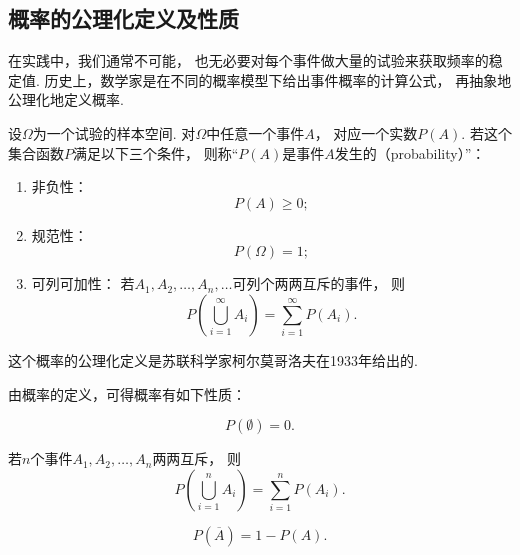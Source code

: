 \subsection{概率的公理化定义及性质}
在实践中，我们通常不可能，
也无必要对每个事件做大量的试验来获取频率的稳定值.
历史上，数学家是在不同的概率模型下给出事件概率的计算公式，
再抽象地公理化地定义概率.

\begin{definition}
设\(\Omega\)为一个试验的样本空间.
对\(\Omega\)中任意一个事件\(A\)，
对应一个实数\(P(A)\).
若这个集合函数\(P\)满足以下三个条件，
则称“\(P(A)\)是事件\(A\)发生的（probability）”：
\begin{enumerate}
	\item 非负性：
	\begin{equation}
	P(A) \geq 0;
	\end{equation}

	\item 规范性：
	\begin{equation}
	P(\Omega) = 1;
	\end{equation}

	\item 可列可加性：
	若\(A_1,A_2,\dotsc,A_n,\dotsc\)可列个两两互斥的事件，
	则\begin{equation}
		P\left(\bigcup_{i=1}^\infty A_i\right)
		= \sum_{i=1}^\infty P(A_i).
	\end{equation}
\end{enumerate}
\end{definition}
这个概率的公理化定义是苏联科学家柯尔莫哥洛夫在1933年给出的.

由概率的定义，可得概率有如下性质：
\begin{property}
\begin{equation}
	P(\emptyset) = 0.
\end{equation}
\end{property}

\begin{property}[有限可加性]
若\(n\)个事件\(A_1,A_2,\dotsc,A_n\)两两互斥，
则\begin{equation}
	P\left(\bigcup_{i=1}^n A_i\right)
	= \sum_{i=1}^n P(A_i).
\end{equation}
\end{property}

\begin{property}
\begin{equation}
	P(\overline{A}) = 1 - P(A).
\end{equation}
\end{property}

